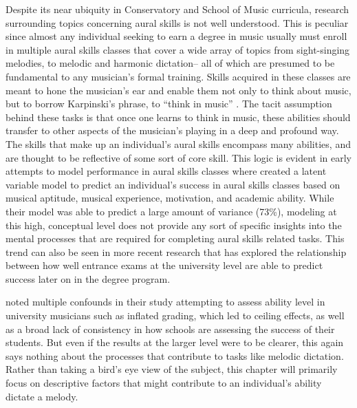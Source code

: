 \documentclass[12pt,]{book}
\begin{document}
Despite its near ubiquity in Conservatory and School of Music curricula, research surrounding topics concerning aural skills is not well understood.
This is peculiar since almost any individual seeking to earn a degree in music usually must enroll in multiple aural skills classes that cover a wide array of topics from sight-singing melodies, to melodic and harmonic dictation-- all of which are presumed to be fundamental to any musician's formal training.
Skills acquired in these classes are meant to hone the musician's ear and enable them not only to think about music, but to borrow Karpinski's phrase, to ``think in music'' \citetext{\citealp[p.4]{karpinskiAuralSkillsAcquisition2000}; \citealp{bestMusicCurriculaFuture1992}}.
The tacit assumption behind these tasks is that once one learns to think in music, these abilities should transfer to other aspects of the musician's playing in a deep and profound way.
The skills that make up an individual's aural skills encompass many abilities, and are thought to be reflective of some sort of core skill.
This logic is evident in early attempts to model performance in aural skills classes where \citet{harrisonEffectsMusicalAptitude1994} created a latent variable model to predict an individual's success in aural skills classes based on musical aptitude, musical experience, motivation, and academic ability.
While their model was able to predict a large amount of variance (73\%), modeling at this high, conceptual level does not provide any sort of specific insights into the mental processes that are required for completing aural skills related tasks.
This trend can also be seen in more recent research that has explored the relationship between how well entrance exams at the university level are able to predict success later on in the degree program.

\citet{wolfGradesReflectDevelopment2014} noted multiple confounds in their study attempting to assess ability level in university musicians such as inflated grading, which led to ceiling effects, as well as a broad lack of consistency in how schools are assessing the success of their students.
But even if the results at the larger level were to be clearer, this again says nothing about the processes that contribute to tasks like melodic dictation.
Rather than taking a bird's eye view of the subject, this chapter will primarily focus on descriptive factors that might contribute to an individual's ability dictate a melody.
\end{document}
